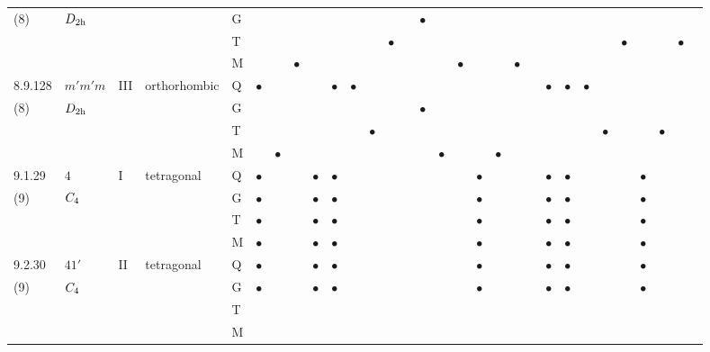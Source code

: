 \documentclass[fleqn,9pt,landscape]{jsarticle}
\begin{document}
\begin{longtable}{lllll|l|lll|ll|lll|l|lll|lll|l|ll|lll|lll}
(8) & $D_{\rm 2h}$ &  &  & G &  &  &  &  &  &  &  &  &  & $\bullet$ &  &  &  &  &  &  &  &  &  &  &  &  &  &  &  \\
 &  &  &  & T &  &  &  &  &  &  &  & $\bullet$ &  &  &  &  &  &  &  &  &  &  &  &  & $\bullet$ &  &  & $\bullet$ &  \\
 &  &  &  & M &  &  & $\bullet$ &  &  &  &  &  &  &  &  & $\bullet$ &  &  & $\bullet$ &  &  &  &  &  &  &  &  &  &  \\ \hline
8.9.128 & \texttt{$m'm'm$} & III & orthorhombic & Q & $\bullet$ &  &  &  & $\bullet$ & $\bullet$ &  &  &  &  &  &  &  &  &  &  & $\bullet$ & $\bullet$ & $\bullet$ &  &  &  &  &  &  \\
(8) & $D_{\rm 2h}$ &  &  & G &  &  &  &  &  &  &  &  &  & $\bullet$ &  &  &  &  &  &  &  &  &  &  &  &  &  &  &  \\
 &  &  &  & T &  &  &  &  &  &  & $\bullet$ &  &  &  &  &  &  &  &  &  &  &  &  & $\bullet$ &  &  & $\bullet$ &  &  \\
 &  &  &  & M &  & $\bullet$ &  &  &  &  &  &  &  &  & $\bullet$ &  &  & $\bullet$ &  &  &  &  &  &  &  &  &  &  &  \\ \hline
9.1.29 & \texttt{$4$} & I & tetragonal & Q & $\bullet$ &  &  & $\bullet$ & $\bullet$ &  &  &  &  &  &  &  & $\bullet$ &  &  &  & $\bullet$ & $\bullet$ &  &  &  & $\bullet$ &  &  &  \\
(9) & $C_{\rm 4}$ &  &  & G & $\bullet$ &  &  & $\bullet$ & $\bullet$ &  &  &  &  &  &  &  & $\bullet$ &  &  &  & $\bullet$ & $\bullet$ &  &  &  & $\bullet$ &  &  &  \\
 &  &  &  & T & $\bullet$ &  &  & $\bullet$ & $\bullet$ &  &  &  &  &  &  &  & $\bullet$ &  &  &  & $\bullet$ & $\bullet$ &  &  &  & $\bullet$ &  &  &  \\
 &  &  &  & M & $\bullet$ &  &  & $\bullet$ & $\bullet$ &  &  &  &  &  &  &  & $\bullet$ &  &  &  & $\bullet$ & $\bullet$ &  &  &  & $\bullet$ &  &  &  \\ \hline
9.2.30 & \texttt{$41'$} & II & tetragonal & Q & $\bullet$ &  &  & $\bullet$ & $\bullet$ &  &  &  &  &  &  &  & $\bullet$ &  &  &  & $\bullet$ & $\bullet$ &  &  &  & $\bullet$ &  &  &  \\
(9) & $C_{\rm 4}$ &  &  & G & $\bullet$ &  &  & $\bullet$ & $\bullet$ &  &  &  &  &  &  &  & $\bullet$ &  &  &  & $\bullet$ & $\bullet$ &  &  &  & $\bullet$ &  &  &  \\
 &  &  &  & T &  &  &  &  &  &  &  &  &  &  &  &  &  &  &  &  &  &  &  &  &  &  &  &  &  \\
 &  &  &  & M &  &  &  &  &  &  &  &  &  &  &  &  &  &  &  &  &  &  &  &  &  &  &  &  &  \\ \hline

\end{longtable}
\end{document}
